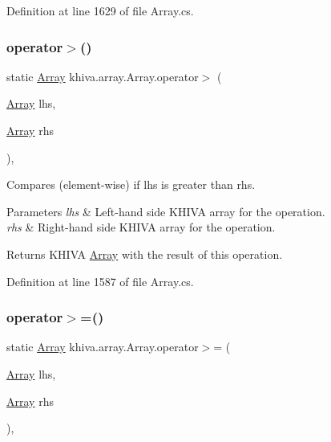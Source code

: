 Definition at line 1629 of file Array.\+cs.

\mbox{\label{classkhiva_1_1array_1_1_array_a63c37c04d800a2360e3bc6a05b4d0fbd}} 
\subsubsection{\texorpdfstring{operator$>$()}{operator>()}}
{\footnotesize\ttfamily static \mbox{\hyperlink{classkhiva_1_1array_1_1_array}{Array}} khiva.\+array.\+Array.\+operator$>$ (\begin{DoxyParamCaption}\item[{\mbox{\hyperlink{classkhiva_1_1array_1_1_array}{Array}}}]{lhs,  }\item[{\mbox{\hyperlink{classkhiva_1_1array_1_1_array}{Array}}}]{rhs }\end{DoxyParamCaption})\hspace{0.3cm}{\ttfamily [inline]}, {\ttfamily [static]}}



Compares (element-\/wise) if lhs is greater than rhs. 


\begin{DoxyParams}{Parameters}
{\em lhs} & Left-\/hand side K\+H\+I\+VA array for the operation.\\
\hline
{\em rhs} & Right-\/hand side K\+H\+I\+VA array for the operation.\\
\hline
\end{DoxyParams}
\begin{DoxyReturn}{Returns}
K\+H\+I\+VA \mbox{\hyperlink{classkhiva_1_1array_1_1_array}{Array}} with the result of this operation.
\end{DoxyReturn}


Definition at line 1587 of file Array.\+cs.

\mbox{\label{classkhiva_1_1array_1_1_array_a9c53762fa8e9ef134c18e56fe2e18da8}} 
\subsubsection{\texorpdfstring{operator$>$=()}{operator>=()}}
{\footnotesize\ttfamily static \mbox{\hyperlink{classkhiva_1_1array_1_1_array}{Array}} khiva.\+array.\+Array.\+operator$>$= (\begin{DoxyParamCaption}\item[{\mbox{\hyperlink{classkhiva_1_1array_1_1_array}{Array}}}]{lhs,  }\item[{\mbox{\hyperlink{classkhiva_1_1array_1_1_array}{Array}}}]{rhs }\end{DoxyParamCaption})\hspace{0.3cm}{\ttfamily [inline]}, {\ttfamily [static]}}




